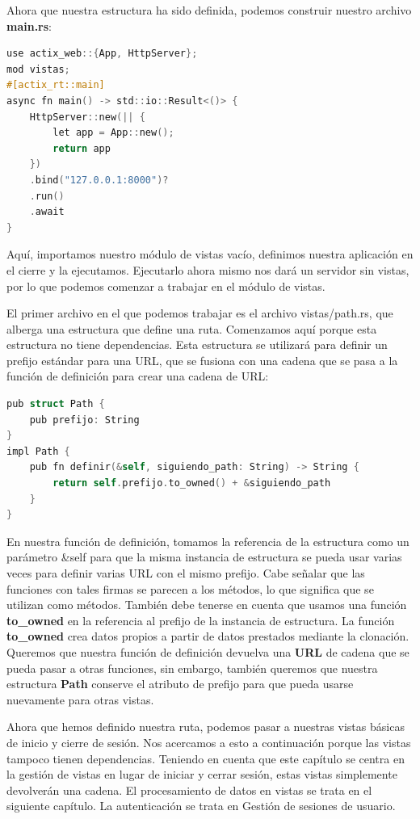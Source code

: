 Ahora que nuestra estructura ha sido definida, podemos construir nuestro archivo \textbf{main.rs}:

\begin{lstlisting}[language=C]
use actix_web::{App, HttpServer};
mod vistas;
#[actix_rt::main]
async fn main() -> std::io::Result<()> {
	HttpServer::new(|| {
		let app = App::new();
		return app
	})
	.bind("127.0.0.1:8000")?
	.run()
	.await
}
\end{lstlisting}

Aquí, importamos nuestro módulo de vistas vacío, definimos nuestra aplicación en el cierre y la ejecutamos. Ejecutarlo ahora mismo nos dará un servidor sin vistas, por lo que podemos comenzar a trabajar en el módulo de vistas.

El primer archivo en el que podemos trabajar es el archivo vistas/path.rs, que alberga una estructura que define una ruta. Comenzamos aquí porque esta estructura no tiene dependencias. Esta estructura se utilizará para definir un prefijo estándar para una URL, que se fusiona con una cadena que se pasa a la función de definición para crear una cadena de URL:

\begin{lstlisting}[language=C]
pub struct Path {
	pub prefijo: String
}
impl Path {
	pub fn definir(&self, siguiendo_path: String) -> String {
		return self.prefijo.to_owned() + &siguiendo_path
	}
}
\end{lstlisting}

En nuestra función de definición, tomamos la referencia de la estructura como un parámetro \&self para que la misma instancia de estructura se pueda usar varias veces para definir varias URL con el mismo prefijo. Cabe señalar que las funciones con tales firmas se parecen a los métodos, lo que significa que se utilizan como métodos. También debe tenerse en cuenta que usamos una función \textbf{to\_owned} en la referencia al prefijo de la instancia de estructura. La función \textbf{to\_owned} crea datos propios a partir de datos prestados mediante la clonación. Queremos que nuestra función de definición devuelva una \textbf{URL} de cadena que se pueda pasar a otras funciones, sin embargo, también queremos que nuestra estructura \textbf{Path} conserve el atributo de prefijo para que pueda usarse nuevamente para otras vistas.

Ahora que hemos definido nuestra ruta, podemos pasar a nuestras vistas básicas de inicio y cierre de sesión. Nos acercamos a esto a continuación porque las vistas tampoco tienen dependencias. Teniendo en cuenta que este capítulo se centra en la gestión de vistas en lugar de iniciar y cerrar sesión, estas vistas simplemente devolverán una cadena. El procesamiento de datos en vistas se trata en el siguiente capítulo. La autenticación se trata en Gestión de sesiones de usuario.

